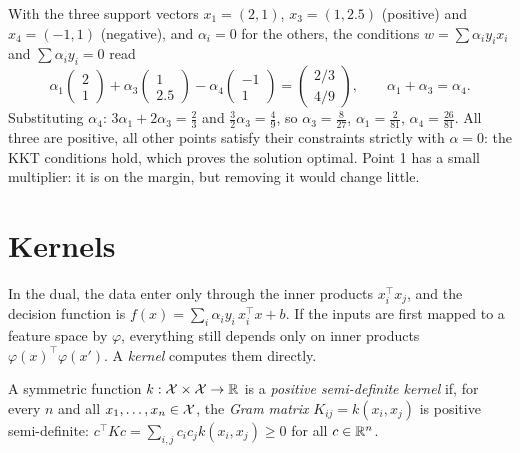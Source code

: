 \begin{notechapter}
\begin{example}\label{svm:ex:dual}
With the three support vectors $x_1 = (2, 1)$, $x_3 = (1, 2.5)$ (positive) and $x_4 = (-1, 1)$ (negative),
and $\alpha_i = 0$ for the others, the conditions $w = \sum\alpha_iy_ix_i$ and $\sum\alpha_iy_i = 0$ read
\[
  \alpha_1\begin{pmatrix}2\\1\end{pmatrix} + \alpha_3\begin{pmatrix}1\\2.5\end{pmatrix} - \alpha_4\begin{pmatrix}-1\\1\end{pmatrix} = \begin{pmatrix}2/3\\4/9\end{pmatrix},\qquad
  \alpha_1 + \alpha_3 = \alpha_4 .
\]
Substituting $\alpha_4$: $3\alpha_1 + 2\alpha_3 = \frac23$ and $\frac32\alpha_3 = \frac49$, so $\alpha_3 = \frac8{27}$, $\alpha_1 = \frac2{81}$, $\alpha_4 = \frac{26}{81}$. All
three are positive, all other points satisfy their constraints strictly with $\alpha = 0$: the
KKT conditions hold, which proves the solution optimal. Point 1 has a small
multiplier: it is on the margin, but removing it would change little.
\end{example}

\section{Kernels}\label{svm:sec:kernels}

In the dual, the data enter only through the inner products $x_i^\top x_j$, and the decision
function is $f(x) = \sum_i\alpha_iy_i\,x_i^\top x + b$. If the inputs are first mapped to a feature space by
$\varphi$, everything still depends only on inner products $\varphi(x)^\top\varphi(x')$. A \emph{kernel} computes
them directly.

\begin{definition}
A symmetric function $k:\mathcal{X}\times\mathcal{X}\to\mathbb{R}$ is a \emph{positive semi-definite kernel} if, for every $n$ and all
$x_1,\dots,x_n\in\mathcal{X}$, the \emph{Gram matrix} $K_{ij} = k(x_i, x_j)$ is positive semi-definite:
$c^\top Kc = \sum_{i,j}c_ic_jk(x_i, x_j)\geq0$ for all $c\in\mathbb{R}^n$.
\end{definition}


\end{notechapter}
